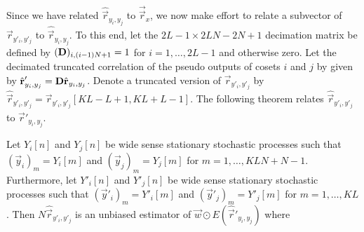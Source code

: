 \documentclass[a4paper, openany, oneside]{memoir}
\begin{document}
Since we have related $\hat{\vec{r}}_{y_i,y_j}$ to $\vec{\vec{r}}_x$, we now make effort to relate a subvector of $\vec{r}_{y'_i,y'_j}$ to $\hat{\vec{r}}_{y_i,y_j}$. To this end, let the $2L-1\times 2LN-2N+1$ decimation matrix be defined by $(\boldsymbol{\mathbf{D}})_{i,(i-1)N+1} = 1$ for $i=1,\ldots,2L-1$ and otherwise zero. Let the decimated truncated correlation of the pseudo outputs of cosets $i$ and $j$ by given by $\hat{\boldsymbol{\mathbf{r}}}'_{y_i,y_j} = \boldsymbol{\mathbf{D}} \hat{\boldsymbol{\mathbf{r}}}_{y_i,y_j}$. Denote a truncated version of $\vec{r}_{y'_i,y'_j}$ by $\hat{\vec{r}}_{y'_i,y'_j}=\vec{r}_{y'_i,y'_j}[KL-L+1,KL+L-1]$. The following theorem relates $\hat{\vec{r}}_{y'_i,y'_j}$ to $\hat{\vec{r}}'_{y_i,y_j}$.

\begin{blockTheorem} 
    Let $Y_i[n]$ and $Y_j[n]$ be wide sense stationary stochastic processes such that $(\vec{y}_i)_m = Y_i[m]$ and $(\vec{y}_j)_m = Y_j[m]$ for $m=1,\ldots,KLN+N-1$. Furthermore, let $Y'_i[n]$ and $Y'_j[n]$ be wide sense stationary stochastic processes such that $(\vec{y}'_i)_m = Y'_i[m]$ and $(\vec{y}'_j)_m = Y'_j[m]$ for $m=1,\ldots,KL$. Then $N\hat{\vec{r}}_{y'_i,y'_j}$ is an unbiased estimator of $\vec{w} \odot E(\hat{\vec{r}}'_{y_i,y_j})$ where

\end{blockTheorem}
\end{document}
